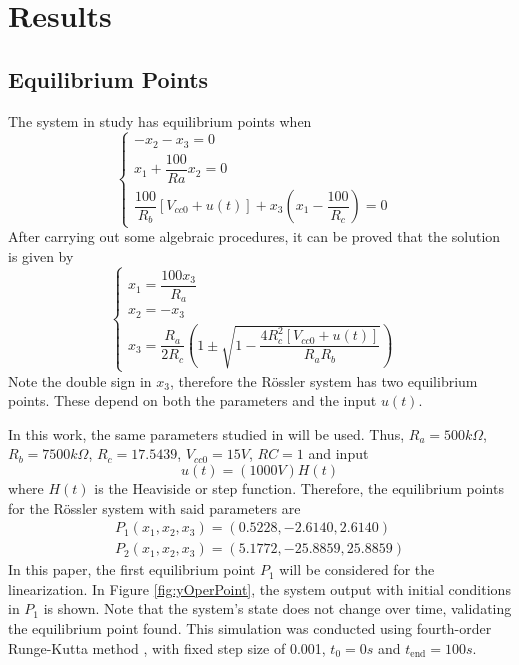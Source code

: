 \section{Results}\label{sec:results}
\subsection{Equilibrium Points}\label{sec:res_equilib}
The system in study has equilibrium points when
\begin{equation}
    \begin{cases}
    -x_2-x_3 = 0&\\
    x_1 + \dfrac{100}{Ra}x_2 = 0&\\
    \dfrac{100}{R_b}\left[V_{cc0} + u(t)\right] + x_3\left(x_1 - \dfrac{100}{R_c}\right)=0&
    \end{cases}
\end{equation}
After carrying out some algebraic procedures, it can be proved that the solution is given by
\begin{equation}
    \begin{cases}
    x_1 = \dfrac{100x_3}{R_a}&\\
    x_2 = -x_3&\\
    x_3 = \dfrac{R_a}{2R_c}\left(1\pm\sqrt{1-\dfrac{4R_c^2\left[V_{cc0}+u(t)\right]}{R_aR_b}}\right)
    \end{cases}
\end{equation}
Note the double sign in $x_3$, therefore the Rössler system has two equilibrium points. These depend on both the parameters and the input $u(t)$.
 
In this work, the same parameters studied in \cite{JS_PL} will be used. Thus, $R_a=500k\Omega$, $R_b=7500k\Omega$, $R_c=17.5439$, $V_{cc0}=15V$, $RC = 1$ and input
\begin{equation}\label{eq:refInput}
    u(t) = (1000V)H(t)
\end{equation}
where $H(t)$ is the Heaviside or step function. Therefore, the equilibrium points for the Rössler system with said parameters are
\begin{equation}\label{eq:operPoints}
    \begin{split}
        P_1(x_1,x_2,x_3)=(0.5228,-2.6140,2.6140)\\
        P_2(x_1,x_2,x_3)=(5.1772,-25.8859,25.8859)
    \end{split}
\end{equation}
In this paper, the first equilibrium point $P_1$ will be considered for the linearization. In Figure \ref{fig:yOperPoint}, the system output with initial conditions in $P_1$ is shown. Note that the system's state does not change over time, validating the equilibrium point found. This simulation was conducted using fourth-order Runge-Kutta method \cite{kutta}, with fixed step size of 0.001, $t_0=0s$ and $t_{\text{end}}=100s$.

